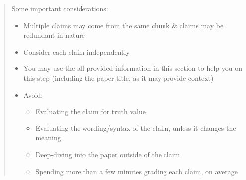 \documentclass{article}
\begin{document}
\begin{quote}
Some important considerations:
\begin{itemize}
    \item Multiple claims may come from the same chunk \& claims may be redundant in nature
    \item Consider each claim independently
    \item You may use the all provided information in this section to help you on this step (including the paper title, as it may provide context)
    \item Avoid:
    \begin{itemize}
        \item Evaluating the claim for truth value
        \item Evaluating the wording/syntax of the claim, unless it changes the meaning
        \item Deep-diving into the paper outside of the claim
        \item Spending more than a few minutes grading each claim, on average
    \end{itemize}
\end{itemize}


\end{quote}
\end{document}
